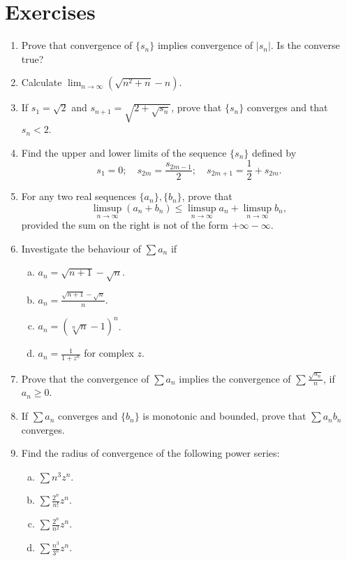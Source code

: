\documentclass{scrbook}
\renewcommand{\to}{\rightarrow}
\begin{document}
\section{Exercises}

\begin{enumerate}
\item %
Prove that convergence of $\{s_n\}$ implies convergence of $|s_n|$. Is the converse true?

\item %
Calculate $\lim_{n \to \infty} (\sqrt{n^2 + n} - n)$.

\item %
If $s_1 = \sqrt{2}$ and $s_{n+1} = \sqrt{2 + \sqrt{s_n}}$, prove that $\{s_n\}$ converges and that $s_n < 2$.

\item %
Find the upper and lower limits of the sequence $\{s_n\}$ defined by
\[
	s_1 = 0; \quad s_{2m} = \frac{s_{2m-1}}{2}; \quad s_{2m+1} = \frac{1}{2} + s_{2m}.
\]

\item %
For any two real sequences $\{a_n\}, \{b_n\}$, prove that
\[
	\limsup_{n \to \infty} (a_n + b_n) \le \limsup_{n \to \infty} a_n + \limsup_{n \to \infty} b_n,
\]
provided the sum on the right is not of the form $+\infty - \infty$.

\item %
Investigate the behaviour of $\sum a_n$ if
\begin{enumerate}[(a)]
\item $a_n = \sqrt{n + 1} - \sqrt{n}$.

\item $a_n = \frac{\sqrt{n + 1} - \sqrt{n}}{n}$.

\item $a_n = \left(\sqrt[n]{n} - 1\right)^n$.

\item $a_n = \frac{1}{1 + z^n}$ for complex $z$.
\end{enumerate}

\item %
Prove that the convergence of $\sum a_n$ implies the convergence of $\sum \frac{\sqrt{a_n}}{n}$, if $a_n \ge 0$.

\item %
If $\sum a_n$ converges and $\{b_n\}$ is monotonic and bounded, prove that $\sum a_nb_n$ converges.

\item %
Find the radius of convergence of the following power series:
\begin{enumerate}[(a)]
\item $\sum n^3z^n$.
\item $\sum \frac{2^n}{n!}z^n$.
\item $\sum \frac{2^n}{n^2} z^n$.
\item $\sum \frac{n^3}{3^n} z^n$.
\end{enumerate}


\end{enumerate}
\end{document}
